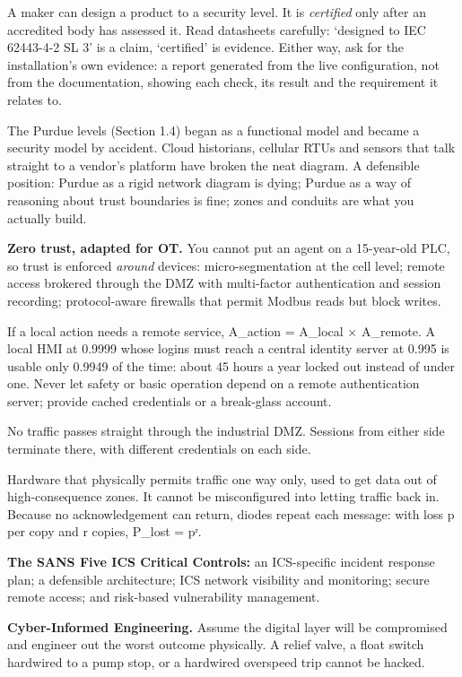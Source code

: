  A maker can design a product to a security level. It is \emph{certified} only after an accredited body has assessed it. Read datasheets carefully: ‘designed to IEC 62443-4-2 SL 3’ is a claim, ‘certified’ is evidence. Either way, ask for the installation's own evidence: a report generated from the live configuration, not from the documentation, showing each check, its result and the requirement it relates to.

The Purdue levels (Section 1.4) began as a functional model and became a security model by accident. Cloud historians, cellular RTUs and sensors that talk straight to a vendor's platform have broken the neat diagram. A defensible position: Purdue as a rigid network diagram is dying; Purdue as a way of reasoning about trust boundaries is fine; zones and conduits are what you actually build.

\textbf{Zero trust, adapted for OT.} You cannot put an agent on a 15-year-old PLC, so trust is enforced \emph{around} devices: micro-segmentation at the cell level; remote access brokered through the DMZ with multi-factor authentication and session recording; protocol-aware firewalls that permit Modbus reads but block writes.

 If a local action needs a remote service, A\_action = A\_local × A\_remote. A local HMI at 0.9999 whose logins must reach a central identity server at 0.995 is usable only 0.9949 of the time: about 45 hours a year locked out instead of under one. Never let safety or basic operation depend on a remote authentication server; provide cached credentials or a break-glass account.

 No traffic passes straight through the industrial DMZ. Sessions from either side terminate there, with different credentials on each side.

 Hardware that physically permits traffic one way only, used to get data out of high-consequence zones. It cannot be misconfigured into letting traffic back in. Because no acknowledgement can return, diodes repeat each message: with loss p per copy and r copies, P\_lost = pʳ.

\textbf{The SANS Five ICS Critical Controls:} an ICS-specific incident response plan; a defensible architecture; ICS network visibility and monitoring; secure remote access; and risk-based vulnerability management.

\textbf{Cyber-Informed Engineering.} Assume the digital layer will be compromised and engineer out the worst outcome physically. A relief valve, a float switch hardwired to a pump stop, or a hardwired overspeed trip cannot be hacked.

